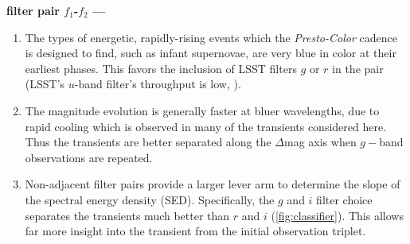 \documentclass[letterpaper,longauthor,trackchanges,twocolumn,onecolappendix,sort&compress]{aastex62}
\newcommand{\dttwo}{\ensuremath{\Delta T_2}}
\begin{document}
\vspace{1.5mm}
{\bf filter pair $f_1$-$f_2$ ---}
\vspace{-3mm}
\begin{enumerate}
    \item 
The types of energetic, rapidly-rising events which the {\em Presto-Color} cadence is designed to find, such as infant supernovae, are very blue in color at their earliest phases. This favors the inclusion of LSST filters $g$ or $r$ in the pair (LSST's $u$-band filter's throughput is low, \citealt{oliver2008}).
\item
The magnitude evolution is generally faster at bluer wavelengths, due to rapid cooling which is observed in many of the transients considered here. Thus the transients are better separated along the $\Delta$mag axis when $g-$band observations are repeated.  
\item
Non-adjacent filter pairs provide a larger lever arm to determine the slope of the spectral energy density (SED).
Specifically, the $g$ and $i$ filter choice separates the transients much better than $r$ and $i$ (\autoref{fig:classifier}).  This allows far more insight into the transient from the initial observation triplet.
\end{enumerate}
 
\end{document}
